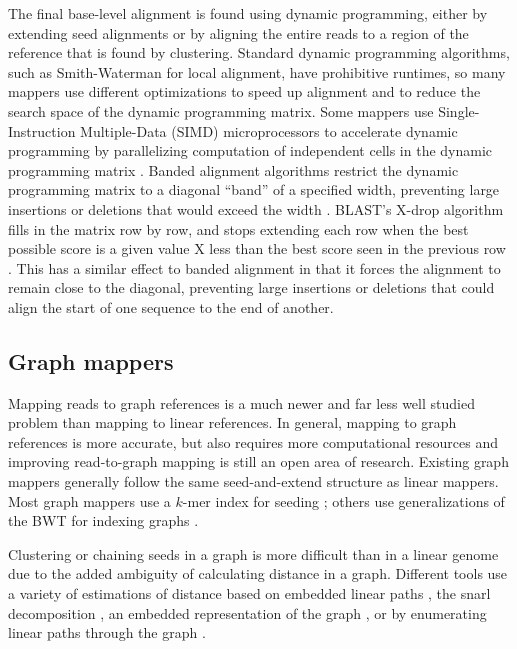\documentclass[11pt]{ucscthesis}
\begin{document}
The final base-level alignment is found using dynamic programming, either by extending seed alignments or by aligning the entire reads to a region of the reference that is found by clustering.
Standard dynamic programming algorithms, such as Smith-Waterman for local alignment, have prohibitive runtimes, so many mappers use different optimizations to speed up alignment and to reduce the search space of the dynamic programming matrix.
Some mappers use Single-Instruction Multiple-Data (SIMD) microprocessors to accelerate dynamic programming by parallelizing computation of independent cells in the dynamic programming matrix \cite{farrar_striped_2007,rognes_six-fold_2000}.
Banded alignment algorithms restrict the dynamic programming matrix to a diagonal ``band'' of a specified width, preventing large insertions or deletions that would exceed the width \cite{chao_aligning_1992}.
BLAST's X-drop algorithm fills in the matrix row by row, and stops extending each row when the best possible score is a given value X less than the best score seen in the previous row \cite{altschul_blast_1990}.
This has a similar effect to banded alignment in that it forces the alignment to remain close to the diagonal, preventing large insertions or deletions that could align the start of one sequence to the end of another.

\subsection{Graph mappers}

Mapping reads to graph references is a much newer and far less well studied problem than mapping to linear references.
In general, mapping to graph references is more accurate, but also requires more computational resources and improving read-to-graph mapping is still an open area of research.
Existing graph mappers generally follow the same seed-and-extend structure as linear mappers\cite{eizenga_pangenome_2020}.
Most graph mappers use a $k$-mer index for seeding \cite{rautiainen_graphaligner_2020,rakocevic_fast_2019,vaddadi_vmap_2019,schneeberger_simultaneous_2009}; others use generalizations of the BWT for indexing graphs \cite{garrison_variation_2018,kim_hisat2_2019}.

Clustering or chaining seeds in a graph is more difficult than in a linear genome due to the added ambiguity of calculating distance in a graph.
Different tools use a variety of estimations of distance based on embedded linear paths \cite{garrison_variation_2018}, the snarl decomposition \cite{rautiainen_graphaligner_2020}, an embedded representation of the graph \cite{vaddadi_vmap_2019}, or by enumerating linear paths through the graph \cite{li_minigraph_2020}.
\end{document}
